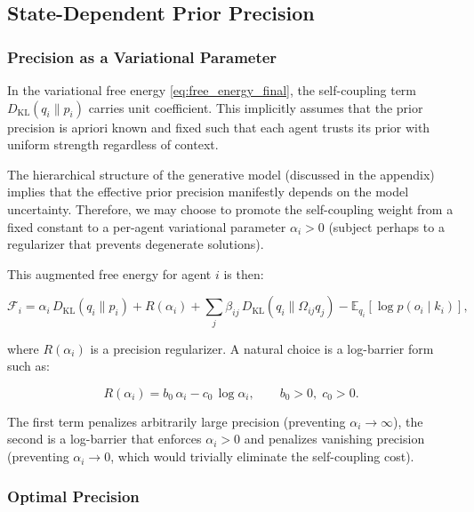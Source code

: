 \documentclass[twoside,11pt]{article}
\begin{document}
\subsection{State-Dependent Prior Precision}
\label{sec:state_dependent_precision}

\subsubsection{Precision as a Variational Parameter}

In the variational free energy \eqref{eq:free_energy_final}, the self-coupling term $D_{\mathrm{KL}}(q_i \| p_i)$ carries unit coefficient. This implicitly assumes that the prior precision is apriori known and fixed such that each agent trusts its prior with uniform strength regardless of context. 

The hierarchical structure of the generative model (discussed in the appendix) implies that the effective prior precision manifestly depends on the model uncertainty. Therefore, we may choose to promote the self-coupling weight from a fixed constant to a per-agent variational parameter $\alpha_i > 0$ (subject perhaps to a regularizer that prevents degenerate solutions).

This augmented free energy for agent $i$ is then:

\begin{equation}
\mathcal{F}_i = \alpha_i\,D_{\mathrm{KL}}(q_i \| p_i)
+ R(\alpha_i)
+ \sum_j \beta_{ij}\,D_{\mathrm{KL}}(q_i \| \Omega_{ij} q_j)
- \mathbb{E}_{q_i}[\log p(o_i \mid k_i)],
\label{eq:free_energy_adaptive}
\end{equation}

where $R(\alpha_i)$ is a precision regularizer. A natural choice is a log-barrier form such as:

\begin{equation}
R(\alpha_i) = b_0\,\alpha_i - c_0\,\log \alpha_i, \qquad b_0 > 0,\; c_0 > 0.
\label{eq:precision_regularizer}
\end{equation}

The first term penalizes arbitrarily large precision (preventing $\alpha_i \to \infty$),  the second is a log-barrier that enforces $\alpha_i > 0$ and penalizes vanishing precision (preventing $\alpha_i \to 0$, which would trivially eliminate the self-coupling cost). 

\subsubsection{Optimal Precision}
\end{document}
